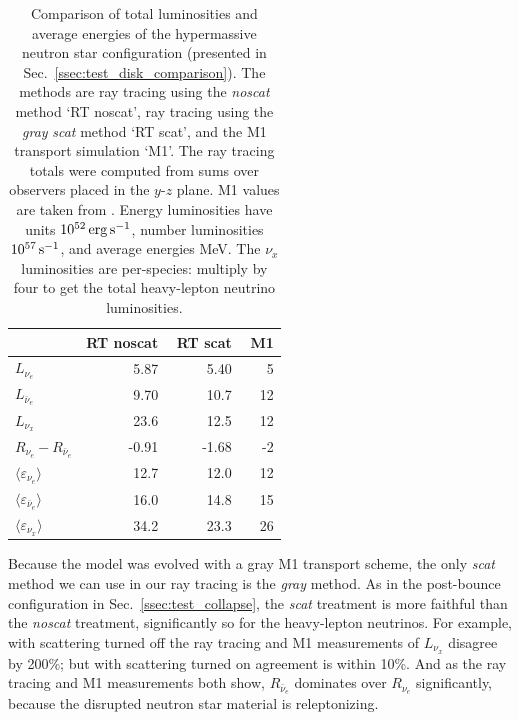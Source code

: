 \documentclass[aps,floatfix,prd,superscriptaddress,twocolumn]{revtex4-1}
\begin{document}
\begin{table}%
  \caption{
    Comparison of total luminosities and average energies
    of the hypermassive neutron star configuration
    (presented in Sec.~\ref{ssec:test_disk_comparison}).
    The methods are ray tracing using the \emph{noscat} method `RT noscat',
    ray tracing using the \emph{gray} \emph{scat} method `RT scat',
    and the M1 transport simulation `M1'.
    The ray tracing totals were computed from sums over
    observers placed in the $y$-$z$ plane.
    M1 values are taken from \cite[Figs. 7, 9, 10]{fouc2016-m1_evolve_n}.
    Energy luminosities have units $10^{52}\,{\rm erg}\,{\rm s}^{-1}$,
    number luminosities $10^{57}\,{\rm s}^{-1}$, and
    average energies MeV.
    The $\nu_x$ luminosities are per-species:
    multiply by four to get the total heavy-lepton neutrino luminosities.
  }
  \label{tab:nsns_rt_vs_m1}
  \begin{tabularx}{\columnwidth}{X r r r}
    & {\bf RT noscat} & \,\,{\bf RT scat} & \,\,{\bf M1} \\
    \hline
    $L_{\nu_e}$                                 & 5.87 & 5.40 & 5 \\
    $L_{\bar{\nu}_e}$                           & 9.70 & 10.7 & 12 \\
    $L_{\nu_x}$                                 & 23.6 & 12.5 & 12 \\
    $R_{\nu_e}-R_{\bar{\nu}_e}$                 & -0.91 & -1.68 & -2 \\
    $\langle \varepsilon_{\nu_e} \rangle$       & 12.7 & 12.0 & 12 \\
    $\langle \varepsilon_{\bar{\nu}_e} \rangle$ & 16.0 & 14.8 & 15 \\
    $\langle \varepsilon_{\nu_x} \rangle$       & 34.2 & 23.3 & 26 \\
    \hline
  \end{tabularx}
\end{table}

Because the model was evolved with a gray M1 transport scheme,
the only \emph{scat} method we can use in our ray tracing is the
\emph{gray} method.
As in the post-bounce configuration in Sec.~\ref{ssec:test_collapse},
the \emph{scat} treatment is more faithful than the \emph{noscat} treatment,
significantly so for the heavy-lepton neutrinos.
For example, with scattering turned off the ray tracing and M1 measurements
of $L_{\nu_x}$ disagree by 200\%;
but with scattering turned on agreement is within 10\%.
And as the ray tracing and M1 measurements both show,
$R_{\bar{\nu}_e}$ dominates over $R_{\nu_e}$ significantly,
because the disrupted neutron star material is releptonizing.
\end{document}
